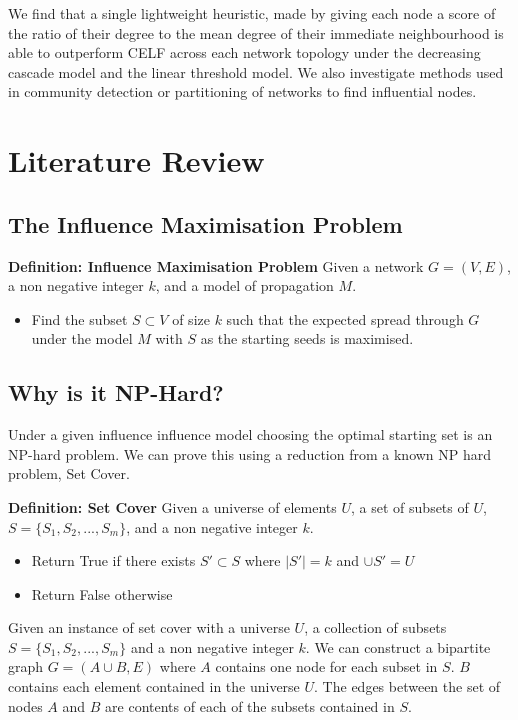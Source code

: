 \documentclass{article}
\begin{document}
We find that a single lightweight heuristic, made by giving each node a score of the ratio of their degree to the mean degree of their immediate neighbourhood is able to outperform CELF across each network topology under the decreasing cascade model and the linear threshold model.
We also investigate methods used in community detection or partitioning of networks to find influential nodes.

\newpage
\section{Literature Review}

\subsection{The Influence Maximisation Problem}

\textbf{Definition: Influence Maximisation Problem} Given a network $G = (V, E)$, a non negative integer $k$, and a model of propagation $M$.
\begin{itemize}
	\item Find the subset $S \subset V$ of size $k$ such that the expected spread through $G$ under the model $M$ with $S$ as the starting seeds is maximised.
\end{itemize}

\subsection{Why is it NP-Hard?}
Under a given influence influence model choosing the optimal starting set is an NP-hard problem.
We can prove this using a reduction from a known NP hard problem, Set Cover.

\vspace{1em}
\noindent \textbf{Definition: Set Cover} Given a universe of elements $U$, a set of subsets of $U$, $S = \{S_1, S_2, ..., S_m\}$, and a non negative integer $k$.
\begin{itemize}
	\item Return True if there exists $S' \subset S$ where $|S'| = k$ and $\cup S' = U$
	\item Return False otherwise
\end{itemize}

Given an instance of set cover with a universe $U$, a collection of subsets $S = \{S_1, S_2, ..., S_m\}$ and a non negative integer $k$.
We can construct a bipartite graph $G = (A \cup B, E)$ where $A$ contains one node for each subset in $S$. $B$ contains each element contained in the universe $U$. The edges between the set of nodes $A$ and $B$ are contents of each of the subsets contained in $S$.
\end{document}
